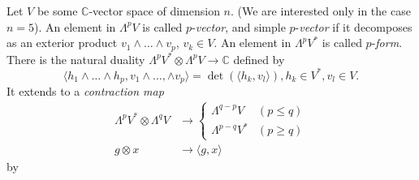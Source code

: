 Let $V$ be some $\mathbb{C}$-vector space of dimension $n$. (We are
interested only in the case $n=5$). An element in $\Lambda^{p}V$ is
called $p$-{\em vector}, and simple $p$-{\em vector} if it decomposes
as an exterior product $v_{1}\wedge\ldots\wedge v_{p}$, $v_{k}\in
V$. An element in $\Lambda^{p}V^{*}$ is called $p$-{\em form}. There
is the natural duality
$\Lambda^{p}V^{*}\otimes \Lambda^{p}V\to \mathbb{C}$ defined by 
$$
\langle h_{1}\wedge\ldots\wedge h_{p}, v_{1}\wedge\ldots,\wedge
v_{p}\rangle=\det (\langle h_{k},v_{l}\rangle), h_{k}\in V^{*},
v_{l}\in V.
$$
It extends to a {\em contraction map}
\begin{align*}
\Lambda^{p}V^{*}\otimes \Lambda^{q}V &\to 
\begin{cases}
\Lambda^{q-p}V & (p\leq q)\\[3pt]
\Lambda^{p-q}V^{*} & (p\geq q)
\end{cases}\\
g\otimes x &\to \langle g,x\rangle
\end{align*}
by
